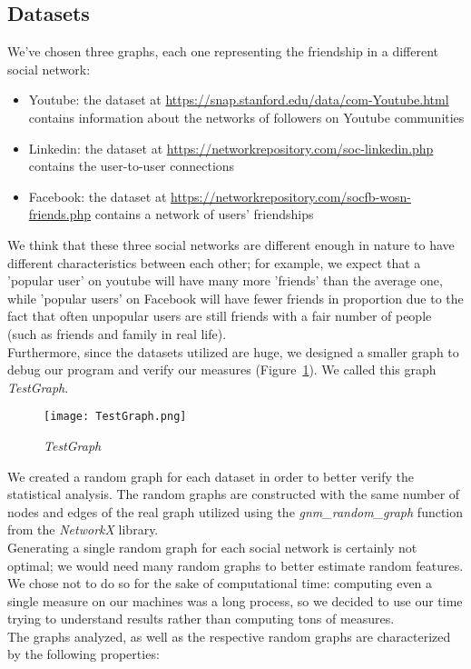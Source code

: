 \documentclass{article}
\begin{document}
\subsection{Datasets}
We’ve chosen three graphs, each one representing the friendship in a different social network:
\begin{itemize}
    \item Youtube: the dataset at \url{https://snap.stanford.edu/data/com-Youtube.html} contains information about the networks of followers on Youtube communities 
    \item Linkedin: the dataset at \url{https://networkrepository.com/soc-linkedin.php} contains the user-to-user connections
    \item Facebook: the dataset at \url{https://networkrepository.com/socfb-wosn-friends.php} contains a network of users' friendships
\end{itemize}
We think that these three social networks are different enough in nature to have different characteristics between each other; for example, we expect that a 'popular user' on youtube will have many more 'friends' than the average one, while 'popular users' on Facebook will have fewer friends in proportion due to the fact that often unpopular users are still friends with a fair number of people (such as friends and family in real life).\\
Furthermore, since the datasets utilized are huge, we designed a smaller graph to debug our program and verify our measures (Figure~\ref{fig:testgraph}). We called this graph \textit{TestGraph}.
\begin{figure}[H]
    \centering
    \texttt{[image: TestGraph.png]}
    \caption{\textit{TestGraph}}
    \label{fig:testgraph}
\end{figure}
We created a random graph for each dataset in order to better verify the statistical analysis. The random graphs are constructed with the same number of nodes and edges of the real graph utilized using the \textit{gnm\_random\_graph} function from the \textit{NetworkX} library.\\
Generating a single random graph for each social network is certainly not optimal; we would need many random graphs to better estimate random features. We chose not to do so for the sake of computational time: computing even a single measure on our machines was a long process, so we decided to use our time trying to understand results rather than computing tons of measures.\\
The graphs analyzed, as well as the respective random graphs are characterized by the following properties:
\end{document}
